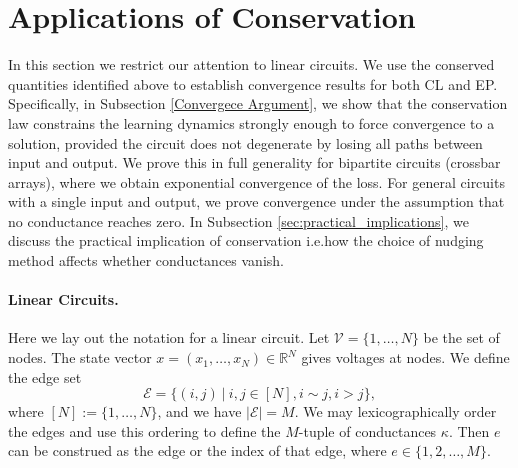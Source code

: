 \documentclass[final, 11pt, nonatbib]{elsarticle}
\theoremstyle{definition}
\theoremstyle{plain}
\numberwithin{equation}{section}
\begin{document}

 
\section{Applications of Conservation}
\label{Cons of C}
In this section we restrict our attention to linear circuits. We use the conserved quantities identified above to     
establish convergence results for both CL and EP. Specifically, in Subsection \ref{Convergece Argument}, we show that the conservation law constrains the      
learning dynamics strongly enough to force convergence to a solution, provided the circuit does not degenerate by
losing all paths between input and output. We prove this in full generality for bipartite circuits (crossbar arrays),
where we obtain exponential convergence of the loss. For general circuits with a single input and output, we prove
convergence under the assumption that no conductance reaches zero. In Subsection \ref{sec:practical_implications}, we discuss the practical implication of conservation i.e.\@ how the choice of nudging method affects whether conductances vanish.

\paragraph{Linear Circuits.}
Here we lay out the notation for a linear circuit. Let $\mathcal{V}=\{1,\ldots,N\}$ be the set of nodes. The state vector $x = (x_1,\ldots,x_N) \in \mathbb{R}^N$ gives voltages at nodes. We define the edge set
\begin{equation}
    \mathcal{E} = \{(i,j) \ | \ i,j\in[N], i \sim j, i >j\},
\end{equation}
where $[N]:=\{1,\ldots,N\}$, and we have $|\mathcal{E}| = M$. We may lexicographically order the edges and use this ordering to define the $M$-tuple of conductances $\kappa$. Then $e$ can be construed as the edge or the index of that edge, where $e \in \{1,2,\ldots,M\}$.
\end{document}

